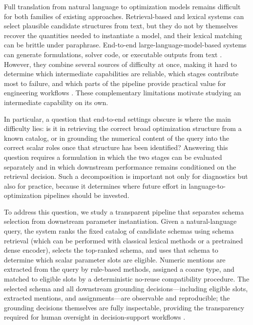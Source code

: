 \documentclass[3p]{elsarticle}
\begin{document}
Full translation from natural language to optimization models remains difficult for both families of existing approaches. Retrieval-based and lexical systems can select plausible candidate structures from text, but they do not by themselves recover the quantities needed to instantiate a model, and their lexical matching can be brittle under paraphrase. End-to-end large-language-model-based systems can generate formulations, solver code, or executable outputs from text \cite{ahmaditeshnizi2024optimus_icml,zhang2024optllm,ahmed2025opt2code}. However, they combine several sources of difficulty at once, making it hard to determine which intermediate capabilities are reliable, which stages contribute most to failure, and which parts of the pipeline provide practical value for engineering workflows \cite{astorga2025autoformulation,huang2025orlm,lu2025optmath}. These complementary limitations motivate studying an intermediate capability on its own.

In particular, a question that end-to-end settings obscure is where the main difficulty lies: is it in retrieving the correct broad optimization structure from a known catalog, or in grounding the numerical content of the query into the correct scalar roles once that structure has been identified? Answering this question requires a formulation in which the two stages can be evaluated separately and in which downstream performance remains conditioned on the retrieval decision. Such a decomposition is important not only for diagnostics but also for practice, because it determines where future effort in language-to-optimization pipelines should be invested.

To address this question, we study a transparent pipeline that separates schema selection from downstream parameter instantiation. Given a natural-language query, the system ranks the fixed catalog of candidate schemas using schema retrieval (which can be performed with classical lexical methods or a pretrained dense encoder), selects the top-ranked schema, and uses that schema to determine which scalar parameter slots are eligible. Numeric mentions are extracted from the query by rule-based methods, assigned a coarse type, and matched to eligible slots by a deterministic no-reuse compatibility procedure. The selected schema and all downstream grounding decisions---including eligible slots, extracted mentions, and assignments---are observable and reproducible; the grounding decisions themselves are fully inspectable, providing the transparency required for human oversight in decision-support workflows \cite{biemans2025explainableoptimization,powell2025scheduling_explanations}.
\end{document}
